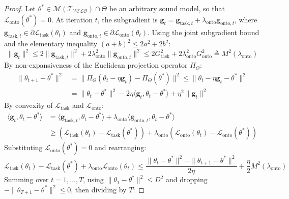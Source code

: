 \documentclass[11pt,a4paper]{article}
\begin{document}
\begin{proof}
Let $\theta^* \in \mathcal{M}(\mathcal{T}_{\mathcal{VCLO}}) \cap \Theta$ be an arbitrary sound model, so that $\mathcal{L}_{\text{onto}}(\theta^*) = 0$.
At iteration $t$, the subgradient is $\mathbf{g}_t = \mathbf{g}_{\text{task}, t} + \lambda_{\text{onto}} \mathbf{g}_{\text{onto}, t}$, where $\mathbf{g}_{\text{task}, t} \in \partial \mathcal{L}_{\text{task}}(\theta_t)$ and $\mathbf{g}_{\text{onto}, t} \in \partial \mathcal{L}_{\text{onto}}(\theta_t)$.
Using the joint subgradient bound and the elementary inequality $(a+b)^2 \le 2a^2 + 2b^2$:
\begin{equation}
\|\mathbf{g}_t\|^2 \le 2 \|\mathbf{g}_{\text{task}, t}\|^2 + 2 \lambda_{\text{onto}}^2 \|\mathbf{g}_{\text{onto}, t}\|^2 \le 2 G_{\text{task}}^2 + 2 \lambda_{\text{onto}}^2 G_{\text{onto}}^2 \triangleq M^2(\lambda_{\text{onto}})
\end{equation}
By non-expansiveness of the Euclidean projection operator $\Pi_\Theta$:
\begin{align}
\|\theta_{t+1} - \theta^*\|^2 &= \|\Pi_\Theta(\theta_t - \eta \mathbf{g}_t) - \Pi_\Theta(\theta^*)\|^2 \le \|\theta_t - \eta \mathbf{g}_t - \theta^*\|^2 \\
&= \|\theta_t - \theta^*\|^2 - 2 \eta \langle \mathbf{g}_t, \theta_t - \theta^* \rangle + \eta^2 \|\mathbf{g}_t\|^2
\end{align}
By convexity of $\mathcal{L}_{\text{task}}$ and $\mathcal{L}_{\text{onto}}$:
\begin{align}
\langle \mathbf{g}_t, \theta_t - \theta^* \rangle &= \langle \mathbf{g}_{\text{task}, t}, \theta_t - \theta^* \rangle + \lambda_{\text{onto}} \langle \mathbf{g}_{\text{onto}, t}, \theta_t - \theta^* \rangle \\
&\ge \left(\mathcal{L}_{\text{task}}(\theta_t) - \mathcal{L}_{\text{task}}(\theta^*)\right) + \lambda_{\text{onto}} \left(\mathcal{L}_{\text{onto}}(\theta_t) - \mathcal{L}_{\text{onto}}(\theta^*)\right)
\end{align}
Substituting $\mathcal{L}_{\text{onto}}(\theta^*) = 0$ and rearranging:
\begin{equation}
\mathcal{L}_{\text{task}}(\theta_t) - \mathcal{L}_{\text{task}}(\theta^*) + \lambda_{\text{onto}} \mathcal{L}_{\text{onto}}(\theta_t) \le \frac{\|\theta_t - \theta^*\|^2 - \|\theta_{t+1} - \theta^*\|^2}{2 \eta} + \frac{\eta}{2} M^2(\lambda_{\text{onto}})
\end{equation}
Summing over $t = 1, \dots, T$, using $\|\theta_1 - \theta^*\|^2 \le D^2$ and dropping $-\|\theta_{T+1} - \theta^*\|^2 \le 0$, then dividing by $T$:

\end{proof}
\end{document}
